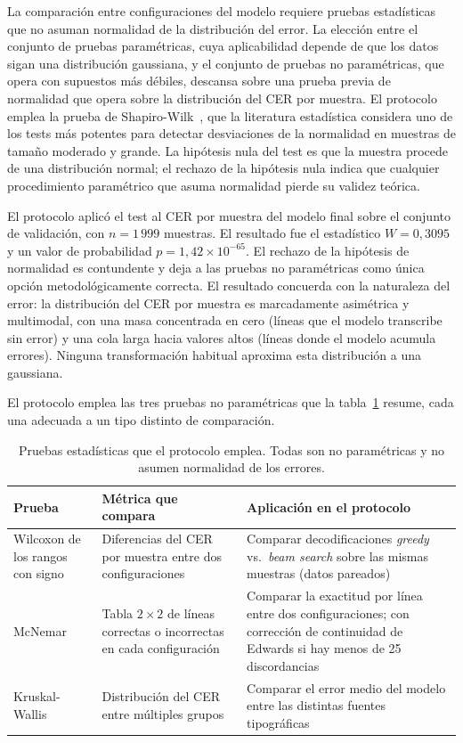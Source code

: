 La comparación entre configuraciones del modelo requiere pruebas estadísticas que no asuman normalidad de la distribución del error. La elección entre el conjunto de pruebas paramétricas, cuya aplicabilidad depende de que los datos sigan una distribución gaussiana, y el conjunto de pruebas no paramétricas, que opera con supuestos más débiles, descansa sobre una prueba previa de normalidad que opera sobre la distribución del CER por muestra. El protocolo emplea la prueba de Shapiro-Wilk~\cite{shapiro1965normality}, que la literatura estadística considera uno de los tests más potentes para detectar desviaciones de la normalidad en muestras de tamaño moderado y grande. La hipótesis nula del test es que la muestra procede de una distribución normal; el rechazo de la hipótesis nula indica que cualquier procedimiento paramétrico que asuma normalidad pierde su validez teórica.

El protocolo aplicó el test al CER por muestra del modelo final sobre el conjunto de validación, con $n = 1\,999$ muestras. El resultado fue el estadístico $W = 0{,}3095$ y un valor de probabilidad $p = 1{,}42 \times 10^{-65}$. El rechazo de la hipótesis de normalidad es contundente y deja a las pruebas no paramétricas como única opción metodológicamente correcta. El resultado concuerda con la naturaleza del error: la distribución del CER por muestra es marcadamente asimétrica y multimodal, con una masa concentrada en cero (líneas que el modelo transcribe sin error) y una cola larga hacia valores altos (líneas donde el modelo acumula errores). Ninguna transformación habitual aproxima esta distribución a una gaussiana.

El protocolo emplea las tres pruebas no paramétricas que la tabla~\ref{tab:tests-estadisticos} resume, cada una adecuada a un tipo distinto de comparación.

\begin{table}[!htbp]
	\centering
	\caption{Pruebas estadísticas que el protocolo emplea. Todas son no paramétricas y no asumen normalidad de los errores.}
	\label{tab:tests-estadisticos}
	\begin{tabular}{p{3.0cm}p{4.5cm}p{6.0cm}}
		\toprule
		\textbf{Prueba} & \textbf{Métrica que compara} & \textbf{Aplicación en el protocolo} \\
		\midrule
		Wilcoxon de los rangos con signo &
		Diferencias del CER por muestra entre dos configuraciones &
		Comparar decodificaciones \textit{greedy} vs.\ \textit{beam search} sobre las mismas muestras (datos pareados) \\
		\addlinespace
		McNemar &
		Tabla $2\times 2$ de líneas correctas o incorrectas en cada configuración &
		Comparar la exactitud por línea entre dos configuraciones; con corrección de continuidad de Edwards si hay menos de 25 discordancias \\
		\addlinespace
		Kruskal-Wallis &
		Distribución del CER entre múltiples grupos &
		Comparar el error medio del modelo entre las distintas fuentes tipográficas \\
		\bottomrule
	\end{tabular}
\end{table}

